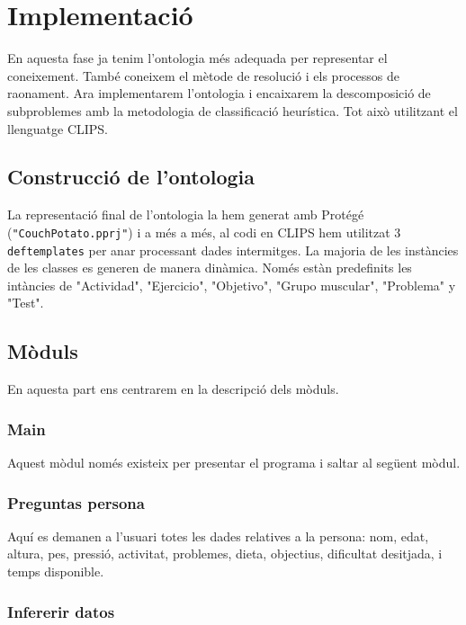 \documentclass[a4paper, 12pt, UTF8]{article}
\begin{document}
\section{Implementació}

En aquesta fase ja tenim l'ontologia més adequada per representar el coneixement. També coneixem el mètode de resolució i els processos de raonament. Ara implementarem l'ontologia i encaixarem la descomposició de subproblemes amb la metodologia de classificació heurística. Tot això utilitzant el llenguatge CLIPS.



\subsection{Construcció de l'ontologia}

La representació final de l'ontologia la hem generat amb Protégé (\verb|"CouchPotato.pprj"|) i a més a més, al codi en CLIPS hem utilitzat 3 \verb|deftemplates| per anar processant dades intermitges. La majoria de les instàncies de les classes es generen de manera dinàmica.  Només estàn predefinits les intàncies de "Actividad",  "Ejercicio", "Objetivo", "Grupo muscular", "Problema" y "Test".

\subsection{Mòduls}

En aquesta part ens centrarem en la descripció dels mòduls.

\subsubsection{Main}


Aquest mòdul només existeix per presentar el programa i saltar al següent mòdul.
\subsubsection{Preguntas persona}

Aquí es demanen a l'usuari totes les dades relatives a la persona: nom, edat, altura, pes, pressió, activitat, problemes, dieta, objectius, dificultat desitjada, i temps disponible.

\subsubsection{Infererir datos}
\end{document}
